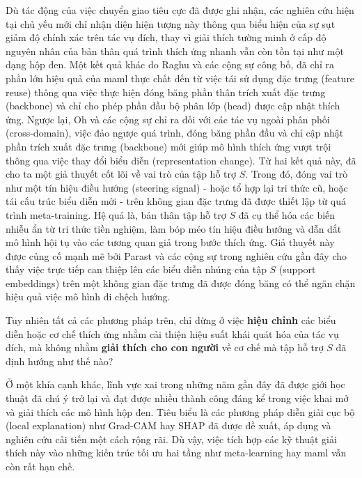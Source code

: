 Dù tác động của việc chuyển giao tiêu cực đã được ghi nhận, các nghiên cứu hiện tại chủ yếu mới chỉ nhận diện hiện tượng này thông qua biểu hiện của sự sụt giảm độ chính xác trên tác vụ đích, thay vì giải thích tường minh ở cấp độ nguyên nhân của bản thân quá trình thích ứng nhanh vẫn còn tồn tại như một dạng hộp đen. Một kết quả khác do Raghu và các cộng sự \cite{raghu2019rapid} công bố, đã chỉ ra phần lớn hiệu quả của \acrshort{maml} thực chất đến từ việc tái sử dụng đặc trưng (feature reuse) thông qua việc thực hiện đóng băng phần thân trích xuất đặc trưng (backbone) và chỉ cho phép phần đầu bộ phân lớp (head) được cập nhật thích ứng. Ngược lại, Oh và các cộng sự \cite{oh2020boil} chỉ ra đối với các tác vụ ngoài phân phối (cross-domain), việc đảo ngược quá trình, đóng băng phần đầu và chỉ cập nhật phần trích xuất đặc trưng (backbone) mới giúp mô hình thích ứng vượt trội thông qua việc thay đổi biểu diễn (representation change). Từ hai kết quả này, đã cho ta một giả thuyết cốt lõi về vai trò của tập hỗ trợ $S$. Trong đó, đóng vai trò như một tín hiệu điều hướng (steering signal) - hoặc tổ hợp lại tri thức cũ, hoặc tái cấu trúc biểu diễn mới - trên không gian đặc trưng đã được thiết lập từ quá trình meta-training. Hệ quả là, bản thân tập hỗ trợ $S$ đã cụ thể hóa các biến nhiễu ẩn từ tri thức tiền nghiệm, làm bóp méo tín hiệu điều hướng và dẫn dắt mô hình hội tụ vào các tương quan giả trong bước thích ứng. Giả thuyết này được củng cố mạnh mẽ bởi Parast và các cộng sự \cite{parast2026hsfm} trong nghiên cứu gần đây cho thấy việc trực tiếp can thiệp lên các biểu diễn nhúng của tập $S$ (support embeddings) trên một không gian đặc trưng đã được đóng băng có thể ngăn chặn hiệu quả việc mô hình đi chệch hướng.

Tuy nhiên tất cả các phương pháp trên, chỉ dừng ở việc \textbf{hiệu chỉnh} các biểu diễn hoặc cơ chế thích ứng nhằm cải thiện hiệu suất khái quát hóa của tác vụ đích, mà không nhằm \textbf{giải thích cho con người} về cơ chế mà tập hỗ trợ $S$ đã định hướng như thế nào? 

Ở một khía cạnh khác, lĩnh vực \acrfull{xai} trong những năm gần đây đã được giới học thuật đã chú ý trở lại và đạt được nhiều thành công đáng kể trong việc khai mở và giải thích các mô hình hộp đen. Tiêu biểu là các phương pháp diễn giải cục bộ (local explanation) như Grad-CAM \cite{selvaraju2017grad} hay SHAP \cite{lundberg2017unified} đã được đề xuất, áp dụng và nghiên cứu cải tiến một cách rộng rãi. Dù vậy, việc tích hợp các kỹ thuật giải thích này vào những kiến trúc tối ưu hai tầng như meta-learning hay \acrshort{maml} vẫn còn rất hạn chế.

